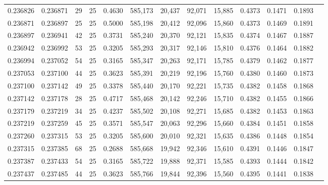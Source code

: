 \begin{tabular}{rrrrrrrrrrrrr}
0.236826 & 0.236871 &    29 &  25 &                                     0.4630 & 585,173 &  20,437 &  92,071 &  15,885 & 0.4373 & 0.1471 & 0.1893 \\
0.236871 & 0.236897 &    25 &  25 &                                     0.5000 & 585,198 &  20,412 &  92,096 &  15,860 & 0.4373 & 0.1469 & 0.1891 \\
0.236897 & 0.236941 &    42 &  25 &                                     0.3731 & 585,240 &  20,370 &  92,121 &  15,835 & 0.4374 & 0.1467 & 0.1887 \\
0.236942 & 0.236992 &    53 &  25 &                                     0.3205 & 585,293 &  20,317 &  92,146 &  15,810 & 0.4376 & 0.1464 & 0.1882 \\
0.236994 & 0.237052 &    54 &  25 &                                     0.3165 & 585,347 &  20,263 &  92,171 &  15,785 & 0.4379 & 0.1462 & 0.1877 \\
0.237053 & 0.237100 &    44 &  25 &                                     0.3623 & 585,391 &  20,219 &  92,196 &  15,760 & 0.4380 & 0.1460 & 0.1873 \\
0.237100 & 0.237142 &    49 &  25 &                                     0.3378 & 585,440 &  20,170 &  92,221 &  15,735 & 0.4382 & 0.1458 & 0.1868 \\
0.237142 & 0.237178 &    28 &  25 &                                     0.4717 & 585,468 &  20,142 &  92,246 &  15,710 & 0.4382 & 0.1455 & 0.1866 \\
0.237179 & 0.237219 &    34 &  25 &                                     0.4237 & 585,502 &  20,108 &  92,271 &  15,685 & 0.4382 & 0.1453 & 0.1863 \\
0.237219 & 0.237259 &    45 &  25 &                                     0.3571 & 585,547 &  20,063 &  92,296 &  15,660 & 0.4384 & 0.1451 & 0.1858 \\
0.237260 & 0.237315 &    53 &  25 &                                     0.3205 & 585,600 &  20,010 &  92,321 &  15,635 & 0.4386 & 0.1448 & 0.1854 \\
0.237315 & 0.237385 &    68 &  25 &                                     0.2688 & 585,668 &  19,942 &  92,346 &  15,610 & 0.4391 & 0.1446 & 0.1847 \\
0.237387 & 0.237433 &    54 &  25 &                                     0.3165 & 585,722 &  19,888 &  92,371 &  15,585 & 0.4393 & 0.1444 & 0.1842 \\
0.237437 & 0.237485 &    44 &  25 &                                     0.3623 & 585,766 &  19,844 &  92,396 &  15,560 & 0.4395 & 0.1441 & 0.1838 \\

\end{tabular}
